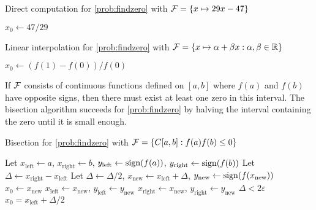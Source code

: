 \begin{algorithm}[H]
\caption{Direct computation for \ref{prob:findzero} with $\mathcal{F} = \{x \mapsto 29x - 47 \}$ \label{alg:zero2947}}
	\begin{algorithmic}
    \RETURN $x_0 \leftarrow 47/29$
    \end{algorithmic}
\end{algorithm}

\begin{algorithm}[H]
\caption{Linear interpolation for \ref{prob:findzero} with $\mathcal{F} = \{x \mapsto \alpha  + \beta x : \alpha, \beta \in \mathbb{R}\}$ \label{alg:zeroLinear}}
	\begin{algorithmic}
    \RETURN $x_0 \leftarrow (f(1) - f(0))/f(0)$
    \end{algorithmic}
\end{algorithm}

If $\mathcal{F}$ consists of continuous functions defined on $[a,b]$ where $f(a)$ and $f(b)$ have opposite signs, then there must exist at least one zero in this interval.  The bisection algorithm succeeds for \ref{prob:findzero} by halving the interval containing the zero until it is small enough.

\begin{algorithm}
\caption{Bisection for \ref{prob:findzero} with $\mathcal{F} = \{C[a,b] : f(a)f(b) \le 0\}$  \label{alg:zeroBisection}}
	\begin{algorithmic}
    \State Let $x_{\text{left}} \leftarrow a$, $x_{\text{right}} \leftarrow b$, $y_{\text{left}} \leftarrow \operatorname{sign}(f(a))$, $y_{\text{right}} \leftarrow \operatorname{sign}(f(b))$
    \State Let $\Delta \leftarrow x_{\text{right}}- x_{\text{left}}$
    \Repeat
    \State Let $\Delta \leftarrow \Delta/2$, $x_{\text{new}} \leftarrow x_{\text{left}} + \Delta$, $y_{\text{new}} \leftarrow \operatorname{sign}(f(x_{\text{new}}))$
    \RETURN $x_0 \leftarrow x_\text{new}$
    \State $x_{\text{left}} \leftarrow x_{\text{new}}$, $y_{\text{left}} \leftarrow y_{\text{new}}$
    \Else
        \State $x_{\text{right}} \leftarrow x_{\text{new}}$, $y_{\text{right}} \leftarrow y_{\text{new}}$
    \EndIf
    \Until $\Delta < 2\varepsilon$
    \RETURN $x_0 = x_{\text{left}} + \Delta/2$

    \end{algorithmic}
\end{algorithm}

